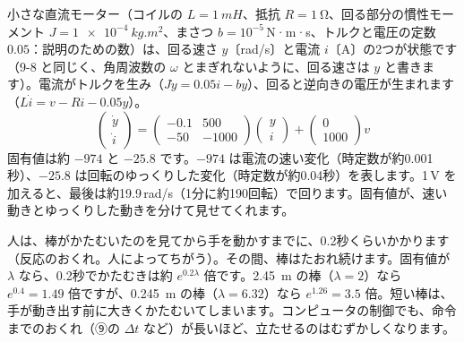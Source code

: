 \begin{motto}[5]
小さな直流モーター（コイルの $L=\qty{1}{mH}$、抵抗 $R=\qty{1}{\ohm}$、回る部分の慣性モーメント $J=\qty{1e-4}{kg.m^2}$、まさつ $b=10^{-5}$\,N·m·s、トルクと電圧の定数 $0.05$：説明のための数）は、回る速さ $y$〔rad/s〕と電流 $i$〔A〕の2つが状態です（9-8 と同じく、角周波数の $\omega$ とまぎれないように、回る速さは $y$ と書きます）。電流がトルクを生み（$J\dot y=0.05i-by$）、回ると逆向きの電圧が生まれます（$L\dot i=v-Ri-0.05y$）。
\[ \begin{pmatrix}\dot y\\\dot i\end{pmatrix}=\begin{pmatrix}-0.1&500\\-50&-1000\end{pmatrix}\begin{pmatrix}y\\i\end{pmatrix}+\begin{pmatrix}0\\1000\end{pmatrix}v \]
固有値は約 $-974$ と $-25.8$ です。$-974$ は電流の速い変化（時定数が約0.001秒）、$-25.8$ は回転のゆっくりした変化（時定数が約0.04秒）を表します。1\,V を加えると、最後は約19.9\,rad/s（1分に約190回転）で回ります。固有値が、速い動きとゆっくりした動きを分けて見せてくれます。
\end{motto}

\begin{motto}[5]
人は、棒がかたむいたのを見てから手を動かすまでに、0.2秒くらいかかります（反応のおくれ。人によってちがう）。その間、棒はたおれ続けます。固有値が $\lambda$ なら、0.2秒でかたむきは約 $e^{0.2\lambda}$ 倍です。\qty{2.45}{m} の棒（$\lambda=2$）なら $e^{0.4}=1.49$ 倍ですが、\qty{0.245}{m} の棒（$\lambda=6.32$）なら $e^{1.26}=3.5$ 倍。短い棒は、手が動き出す前に大きくかたむいてしまいます。コンピュータの制御でも、命令までのおくれ（⑨の $\Delta t$ など）が長いほど、立たせるのはむずかしくなります。
\end{motto}





